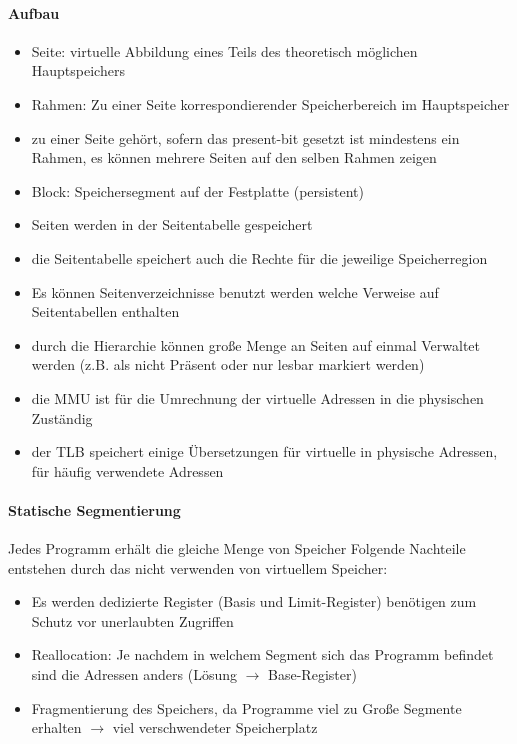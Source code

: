 \documentclass[12pt,a4paper]{article}
\begin{document}
\paragraph{Aufbau}
\flushleft
\begin{itemize}
\item Seite: virtuelle Abbildung eines Teils des theoretisch möglichen Hauptspeichers
\item Rahmen: Zu einer Seite korrespondierender Speicherbereich im Hauptspeicher 
\item zu einer Seite gehört, sofern das present-bit gesetzt ist mindestens ein Rahmen, es können mehrere Seiten auf den selben Rahmen zeigen
\item Block: Speichersegment auf der Festplatte (persistent)
\item Seiten werden in der Seitentabelle gespeichert
\item die Seitentabelle speichert auch die Rechte für die jeweilige Speicherregion
\item Es können Seitenverzeichnisse benutzt werden welche Verweise auf Seitentabellen enthalten
\item durch die Hierarchie können große Menge an Seiten auf einmal Verwaltet werden (z.B. als nicht Präsent oder nur lesbar markiert werden)
\item die MMU ist für die Umrechnung der virtuelle Adressen in die physischen Zuständig
\item der TLB speichert einige Übersetzungen für virtuelle in physische Adressen, für häufig verwendete Adressen
\end{itemize}

\paragraph{Statische Segmentierung}
\flushleft
Jedes Programm erhält die gleiche Menge von Speicher
Folgende Nachteile entstehen durch das nicht verwenden von virtuellem Speicher:
\begin{itemize}
\item Es werden dedizierte Register (Basis und Limit-Register) benötigen zum Schutz vor unerlaubten Zugriffen
\item Reallocation: Je nachdem in welchem Segment sich das Programm befindet sind die Adressen anders (Lösung $\rightarrow$ Base-Register)
\item Fragmentierung des Speichers, da Programme viel zu Große Segmente erhalten $\rightarrow$ viel verschwendeter Speicherplatz
\end{itemize}
\end{document}
